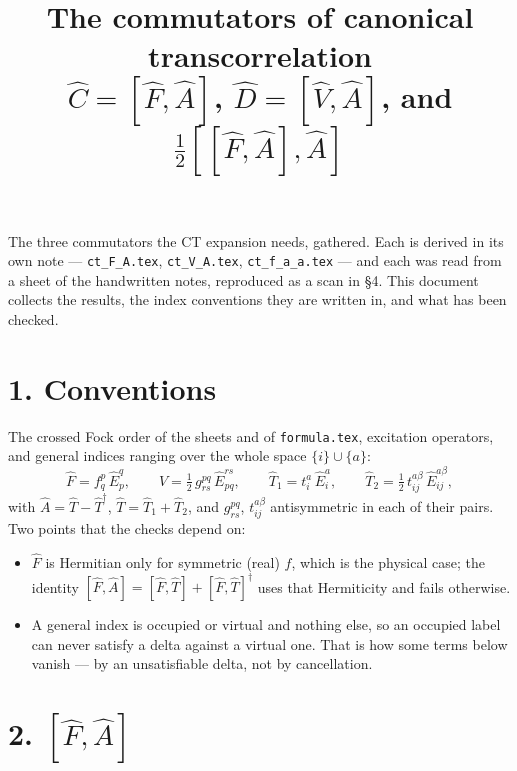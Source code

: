 \documentclass[11pt]{article}
\title{\bfseries The commutators of canonical transcorrelation\\[4pt]
  \large $\hat C=[\hat F,\hat A]$, $\hat D=[\hat V,\hat A]$, and
  $\tfrac12[[\hat F,\hat A],\hat A]$}
\author{}
\date{}
\newcommand{\E}[2]{\hat E^{#1}_{#2}}
\newcommand{\occ}{i}
\newcommand{\vir}{a}
\begin{document}
\maketitle
\vspace{-2.5em}

\noindent
The three commutators the CT expansion needs, gathered. Each is derived in its
own note --- \texttt{ct\_F\_A.tex}, \texttt{ct\_V\_A.tex},
\texttt{ct\_f\_a\_a.tex} --- and each was read from a sheet of the handwritten
notes, reproduced as a scan in \S4. This document collects the results, the
index conventions they are written in, and what has been checked.

\section*{1. Conventions}

The crossed Fock order of the sheets and of \texttt{formula.tex}, excitation
operators, and general indices ranging over the whole space
$\{\occ\}\cup\{\vir\}$:
\begin{equation}
  \hat F=f^p_q\,\E{q}{p},
  \qquad
  \hat V=\tfrac12\,g^{pq}_{rs}\,\E{rs}{pq},
  \qquad
  \hat T_1=t^\vir_\occ\,\E{\vir}{\occ},
  \qquad
  \hat T_2=\tfrac12\,t^{\vir\beta}_{\occ j}\,\E{\vir\beta}{\occ j},
  \label{eq:ops}
\end{equation}
with $\hat A=\hat T-\hat T^\dagger$, $\hat T=\hat T_1+\hat T_2$, and
$g^{pq}_{rs}$, $t^{\vir\beta}_{\occ j}$ antisymmetric in each of their pairs.
Two points that the checks depend on:

\begin{itemize}
  \item $\hat F$ is Hermitian only for symmetric (real) $f$, which is the
        physical case; the identity
        $[\hat F,\hat A]=[\hat F,\hat T]+[\hat F,\hat T]^\dagger$ uses that
        Hermiticity and fails otherwise.
  \item A general index is occupied or virtual and nothing else, so an
        occupied label can never satisfy a delta against a virtual one. That is
        how some terms below vanish --- by an unsatisfiable delta, not by
        cancellation.
\end{itemize}

\section*{2. \texorpdfstring{$[\hat F,\hat A]$}{[F,A]}}
\end{document}
